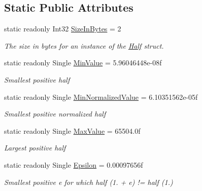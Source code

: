 \subsection*{Static Public Attributes}
\begin{DoxyCompactItemize}
\item 
static readonly Int32 \hyperlink{struct_open_t_k_1_1_half_abe15fc6db4ae97079233802277b8bcad}{Size\-In\-Bytes} = 2
\begin{DoxyCompactList}\small\item\em The size in bytes for an instance of the \hyperlink{struct_open_t_k_1_1_half}{Half} struct.\end{DoxyCompactList}\item 
static readonly Single \hyperlink{struct_open_t_k_1_1_half_afb6cea32ac0dd56fe8455d730d8fbde1}{Min\-Value} = 5.\-96046448e-\/08f
\begin{DoxyCompactList}\small\item\em Smallest positive half\end{DoxyCompactList}\item 
static readonly Single \hyperlink{struct_open_t_k_1_1_half_abda2208f9300afdd617d8d4ac320d21f}{Min\-Normalized\-Value} = 6.\-10351562e-\/05f
\begin{DoxyCompactList}\small\item\em Smallest positive normalized half\end{DoxyCompactList}\item 
static readonly Single \hyperlink{struct_open_t_k_1_1_half_a09fed5fc5cbc255618c752289932f25b}{Max\-Value} = 65504.\-0f
\begin{DoxyCompactList}\small\item\em Largest positive half\end{DoxyCompactList}\item 
static readonly Single \hyperlink{struct_open_t_k_1_1_half_a7f118e0313f8be004885fb7d536ecbf6}{Epsilon} = 0.\-00097656f
\begin{DoxyCompactList}\small\item\em Smallest positive e for which half (1. + e) != half (1.)\end{DoxyCompactList}\end{DoxyCompactItemize}
